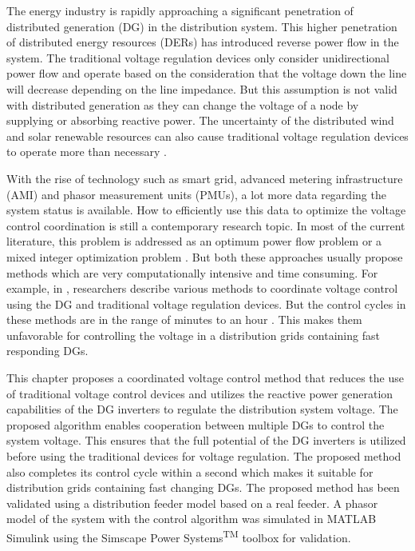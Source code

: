 The energy industry is rapidly approaching a significant penetration of distributed generation (DG) in the distribution system. This higher penetration of distributed energy resources (DERs) has introduced reverse power flow in the system. The traditional voltage regulation devices only consider unidirectional power flow and operate based on the consideration that the voltage down the line will decrease depending on the line impedance. But this assumption is not valid with distributed generation as they can change the voltage of a node by supplying or absorbing reactive power. The uncertainty of the distributed wind and solar renewable resources can also cause traditional voltage regulation devices to operate more than necessary \cite{int1}.

With the rise of technology such as smart grid, advanced metering infrastructure (AMI) and phasor measurement units (PMUs), a lot more data regarding the system status is available. How to efficiently use this data to optimize the voltage control coordination is still a contemporary research topic. In most of the current literature, this problem is addressed as an optimum power flow problem or a mixed integer optimization problem \cite{int2}. But both these approaches usually propose methods which are very computationally intensive and time consuming. For example, in \cite{LR5,LR1,LR2,LR3}, researchers describe various methods to coordinate voltage control using the DG and traditional voltage regulation devices. But the control cycles in these methods are in the range of minutes to an hour \cite{LR4}. This makes them unfavorable for controlling the voltage in a distribution grids containing fast responding DGs.

This chapter proposes a coordinated voltage control method that reduces the use of traditional voltage control devices and utilizes the reactive power generation capabilities of the DG inverters to regulate the distribution system voltage. The proposed algorithm enables cooperation between multiple DGs to control the system voltage. This ensures that the full potential of the DG inverters is utilized before using the traditional devices for voltage regulation. The proposed method also completes its control cycle within a second which makes it suitable for distribution grids containing fast changing DGs. The proposed method has been validated using a distribution feeder model based on a real feeder. A phasor model of the system with the control algorithm was simulated in MATLAB\textsuperscript{\textregistered} Simulink\textsuperscript{\textregistered} using the Simscape Power Systems\textsuperscript{TM} toolbox for validation.


